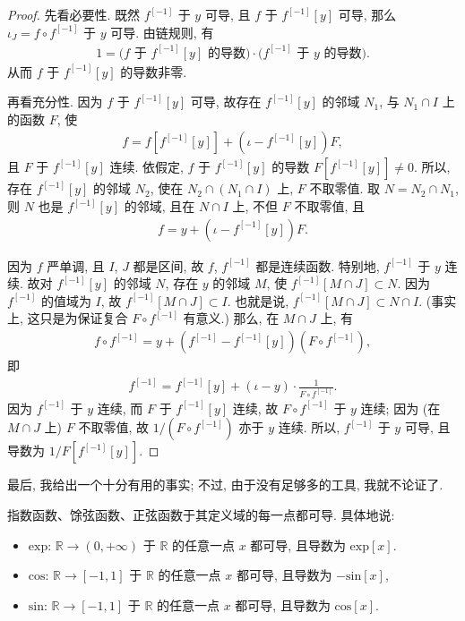 \begin{proof}
    先看必要性. 既然 $f^{[-1]}$ 于 $y$ 可导, 且 $f$ 于 $f^{[-1]} [y]$ 可导, 那么 $\iota_J = f \circ f^{[-1]}$ 于 $y$ 可导. 由链规则, 有
    \begin{align*}
        1 = \text{($f$ 于 $f^{[-1]} [y]$ 的导数)} \cdot \text{($f^{[-1]}$ 于 $y$ 的导数)}.
    \end{align*}
    从而 $f$ 于 $f^{[-1]} [y]$ 的导数非零.

    再看充分性. 因为 $f$ 于 $f^{[-1]} [y]$ 可导, 故存在 $f^{[-1]} [y]$ 的邻域 $N_1$, 与 $N_1 \cap I$ 上的函数 $F$, 使
    \begin{align*}
        f = f[f^{[-1]} [y]] + (\iota - f^{[-1]} [y])F,
    \end{align*}
    且 $F$ 于 $f^{[-1]} [y]$ 连续. 依假定, $f$ 于 $f^{[-1]} [y]$ 的导数 $F[f^{[-1]} [y]] \neq 0$. 所以, 存在 $f^{[-1]} [y]$ 的邻域 $N_2$, 使在 $N_2 \cap (N_1 \cap I)$ 上, $F$ 不取零值. 取 $N = N_2 \cap N_1$, 则 $N$ 也是 $f^{[-1]} [y]$ 的邻域, 且在 $N \cap I$ 上, 不但 $F$ 不取零值, 且
    \begin{align*}
        f = y + (\iota - f^{[-1]} [y])F.
    \end{align*}

    因为 $f$ 严单调, 且 $I$, $J$ 都是区间, 故 $f$, $f^{[-1]}$ 都是连续函数. 特别地, $f^{[-1]}$ 于 $y$ 连续. 故对 $f^{[-1]} [y]$ 的邻域 $N$, 存在 $y$ 的邻域 $M$, 使 $f^{[-1]} [M \cap J] \subset N$. 因为 $f^{[-1]}$ 的值域为 $I$, 故 $f^{[-1]} [M \cap J] \subset I$. 也就是说, $f^{[-1]} [M \cap J] \subset N \cap I$. (事实上, 这只是为保证复合 $F \circ f^{[-1]}$ 有意义.) 那么, 在 $M \cap J$ 上, 有
    \begin{align*}
        f \circ f^{[-1]} = y + (f^{[-1]} - f^{[-1]} [y]) (F \circ f^{[-1]}),
    \end{align*}
    即
    \begin{align*}
        f^{[-1]} = f^{[-1]} [y] + (\iota - y) \cdot \frac{1}{F \circ f^{[-1]}}.
    \end{align*}
    因为 $f^{[-1]}$ 于 $y$ 连续, 而 $F$ 于 $f^{[-1]} [y]$ 连续, 故 $F \circ f^{[-1]}$ 于 $y$ 连续; 因为 (在 $M \cap J$ 上) $F$ 不取零值, 故 $1/(F \circ f^{[-1]})$ 亦于 $y$ 连续. 所以, $f^{[-1]}$ 于 $y$ 可导, 且导数为 $1/F[f^{[-1]} [y]]$.
\end{proof}

最后, 我给出一个十分有用的事实; 不过, 由于没有足够多的工具, 我就不论证了.

\begin{theorem}
    指数函数、馀弦函数、正弦函数于其定义域的每一点都可导. 具体地说:
    \begin{itemize}
        \item $\mathrm{exp}$: $\mathbb{R} \to (0, +\infty)$ 于 $\mathbb{R}$ 的任意一点 $x$ 都可导, 且导数为 $\mathrm{exp} [x]$.
        \item $\mathrm{cos}$: $\mathbb{R} \to [-1, 1]$ 于 $\mathbb{R}$ 的任意一点 $x$ 都可导, 且导数为 $-\mathrm{sin} [x]$,
        \item $\mathrm{sin}$: $\mathbb{R} \to [-1, 1]$ 于 $\mathbb{R}$ 的任意一点 $x$ 都可导, 且导数为 $\mathrm{cos} [x]$.
    \end{itemize}
\end{theorem}

